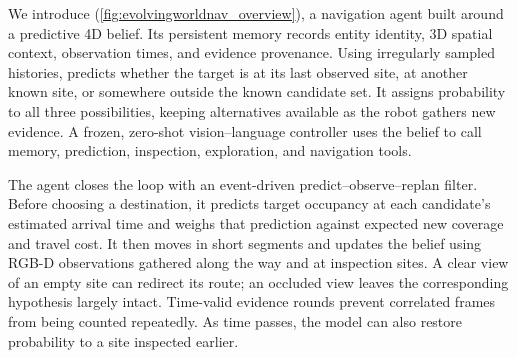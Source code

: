 We introduce \textbf{\evolvingworldnav{}} (\cref{fig:evolvingworldnav_overview}), a navigation agent built around a predictive 4D belief. 
Its persistent memory records entity identity, 3D spatial context, observation times, and evidence provenance. Using irregularly sampled histories, \pfdnav{} predicts whether the target is at its last observed site, at another known site, or somewhere outside the known candidate set. 
It assigns probability to all three possibilities, keeping alternatives available as the robot gathers new evidence. 
A frozen, zero-shot vision--language controller uses the belief to call memory, prediction, inspection, exploration, and navigation tools.

The agent closes the loop with an event-driven predict--observe--replan filter. 
Before choosing a destination, it predicts target occupancy at each candidate's estimated arrival time and weighs that prediction against expected new coverage and travel cost. 
It then moves in short segments and updates the belief using RGB-D observations gathered along the way and at inspection sites. 
A clear view of an empty site can redirect its route; an occluded view leaves the corresponding hypothesis largely intact. 
Time-valid evidence rounds prevent correlated frames from being counted repeatedly. 
As time passes, the model can also restore probability to a site inspected earlier.


